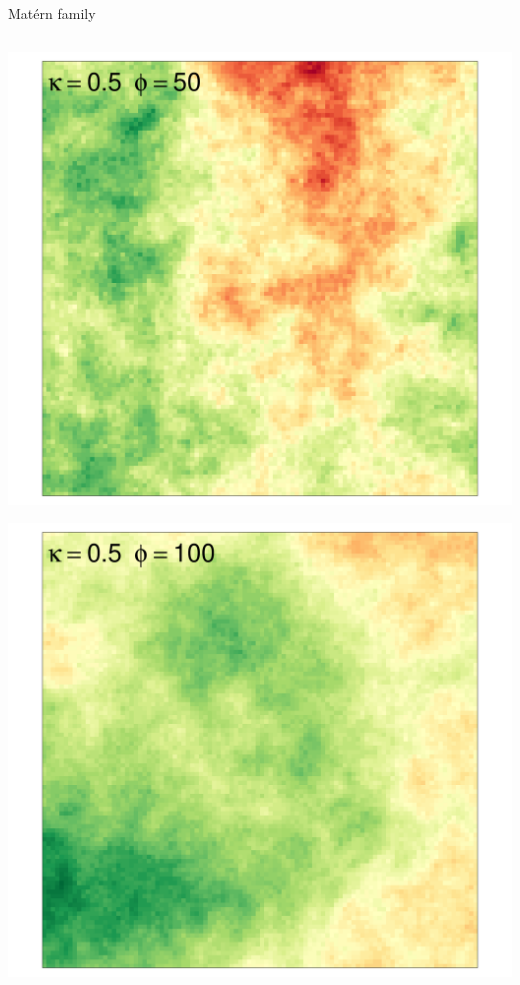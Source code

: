 \documentclass[
  ignorenonframetext,
]{beamer}
\begin{document}
\begin{frame}{Matérn family}
\begin{columns}[T]
\begin{column}{0.33\textwidth}
\includegraphics{Lecture_1_files/figure-beamer/unnamed-chunk-30-1.pdf}

\includegraphics{Lecture_1_files/figure-beamer/unnamed-chunk-31-1.pdf}
\end{column}
\end{columns}
\end{frame}
\end{document}
